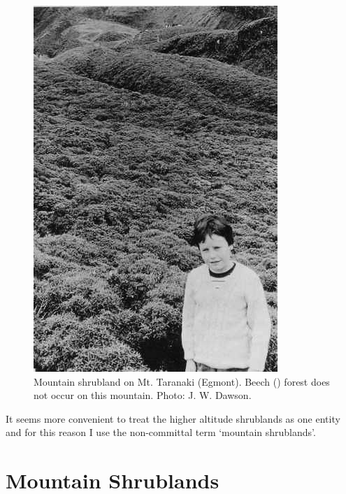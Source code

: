 \begin{figure}[t]
\begin{minipage}[t]{\textwidth}
\begin{minipage}[t]{(\textwidth-\fgap) * \real{0.29}}
			\includegraphics[width=\textwidth]{graphics/figure91shrubland.jpg}
			\caption[Mountain shrubland on Mt.
			Taranaki]{Mountain shrubland on Mt.
			Taranaki (Egmont).
			Beech () forest does not occur on this mountain.
			Photo: J. W. Dawson.}%
			\label{fig:91shrubland}
		\end{minipage}
	\end{minipage}
\end{figure}

It seems more convenient to treat the higher altitude shrublands as one entity and for this reason I use the non-committal term `mountain shrublands'.

\section{Mountain Shrublands}

